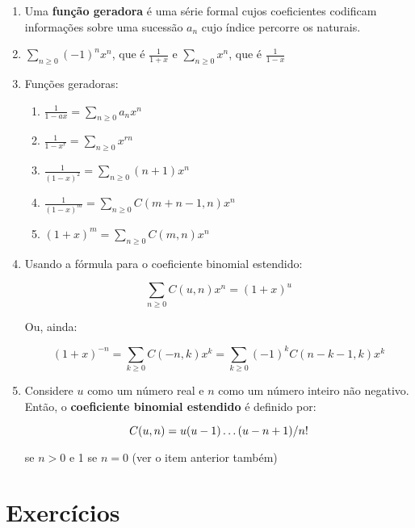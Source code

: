 \documentclass{article}
\begin{document}
\begin{enumerate}
	\item Uma \textbf{função geradora} é uma série formal cujos coeficientes codificam informações sobre uma sucessão \( a_n \) cujo índice percorre os naturais.

	\item \( \sum_{n \geq 0 }{(-1)^nx^n} \), que é \( \frac{1}{1 + x} \) e \( \sum_{n \geq 0}{x^n} \), que é \( \frac{1}{1 - x} \)

	\item Funções geradoras:

	      \begin{enumerate}

		      \item \( \frac{1}{1 - ax} = \sum_{n \geq 0}{a_nx^n} \)

		      \item \( \frac{1}{1 - x^r} = \sum_{n \geq 0}{x^{rn}} \)

		      \item \( \frac{1}{(1 - x)^2} = \sum_{n \geq 0}{(n+1)x^n} \)

		      \item \( \frac{1}{(1 - x)^m} = \sum_{n \geq 0}{C(m+n-1,n)x^n} \)

		      \item \( (1+x)^m = \sum_{n \geq 0}{C(m,n)x^n} \)

	      \end{enumerate}

	\item Usando a fórmula para o coeficiente binomial estendido:

	      \[ \sum_{n \geq 0 }{C(u,n)x^n} = (1+x)^u \]

	      Ou, ainda:

	      \[ (1+x)^{-n} = \sum_{k \geq 0}{C(-n,k)x^k = \sum_{k \geq 0}{(-1)^k C(n-k-1,k) x^k}} \]

	\item Considere \( u \) como um número real e \( n \) como um número inteiro não negativo. Então, o \textbf{coeficiente binomial estendido} é definido por:

	      \[ C(u,n) = u(u-1) \mathellipsis (u-n+1)/n! \]

	      se \( n > 0 \) e 1 se \( n = 0 \) (ver o item anterior também)

\end{enumerate}

\section*{Exercícios}
\end{document}
